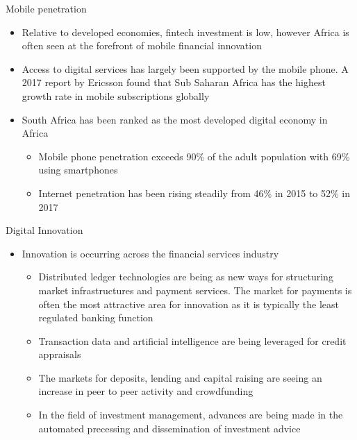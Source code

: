 \documentclass[9pt]{beamer}
\begin{document}
\begin{frame}{Mobile penetration}
	\begin{itemize}
		\item Relative to developed economies, fintech investment is low, however Africa is often seen at the forefront of mobile financial innovation
		\item Access to digital services has largely been supported by the mobile phone. A 2017 report by Ericsson found that Sub Saharan Africa has the highest growth rate in mobile subscriptions globally
		\item South Africa has been ranked as the most developed digital economy in Africa
		\begin{itemize}
			\item Mobile phone penetration exceeds 90\% of the adult population with 69\% using smartphones
			\item Internet penetration has been rising steadily from 46\% in 2015 to 52\% in 2017
		\end{itemize}
	\end{itemize}
\end{frame}


\begin{frame}{Digital Innovation}
	\begin{itemize}
		\item Innovation is occurring across the financial services industry
		\begin{itemize}
			\item Distributed ledger technologies are being as new ways for structuring market infrastructures and payment services. The market for payments is often the most attractive area for innovation as it is typically the least regulated banking function
			\item Transaction data and artificial intelligence are being leveraged for credit appraisals
			\item The markets for deposits, lending and capital raising are seeing an increase in peer to peer activity and crowdfunding
			\item In the field of investment management, advances are being made in the automated precessing and dissemination of investment advice
		\end{itemize}
	\end{itemize}
\end{frame}
\end{document}
